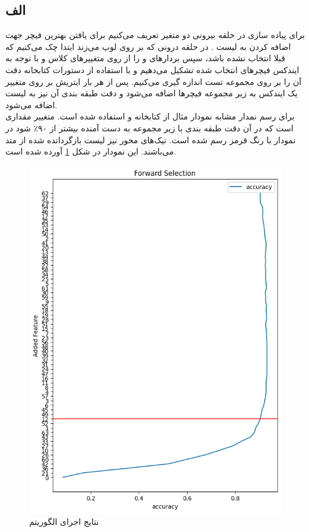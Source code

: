 \documentclass[12pt,onecolumn,a4paper]{article}
\begin{document}
\subsection*{الف}
برای پیاده سازی  در حلقه  بیرونی دو متغیر تعریف می‌کنیم برای یافتن بهترین فیچر جهت اضافه کردن به لیست . در حلقه  درونی که بر روی  لوپ می‌زند ابتدا چک می‌کنیم که  قبلا انتخاب نشده باشد، سپس بردارهای  و  را از روی متغییرهای کلاس و با توجه به ایندکس فیچرهای انتخاب شده تشکیل می‌دهیم و با استفاده از دستورات کتابخانه  دقت آن را بر روی مجموعه تست اندازه گیری می‌کنیم. پس از هر بار ایتریش بر روی متغییر  یک ایندکس به زیر مجموعه فیچرها اضافه می‌شود و دقت طبقه بندی آن نیز به لیست  اضافه می‌شود.
\\
برای رسم نمدار مشابه نمودار مثال از کتابخانه  و  استفاده شده است. متغییر  مقداری است که در آن دقت طبقه بندی با زیر مجموعه به دست آمنده بیشتر از ۹۰٪ شود در نمودار با رنگ قرمز رسم شده است. تیک‌های محور  نیز لیست بازگردانده شده از متد  می‌باشند. این نمودار در شکل \ref{fig:1} آورده شده است.
\begin{figure}[h!]
    \begin{center}
    \includegraphics[scale=0.55]{plots/q6_a.png}
    \caption{نتایج اجرای الگوریتم }
    \label{fig:1}
    \end{center}
\end{figure}
\end{document}
